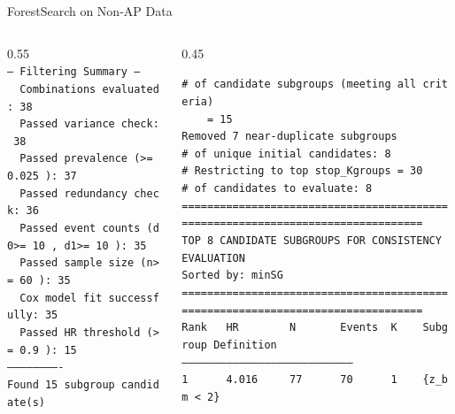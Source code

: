 \documentclass[
  ignorenonframetext,
  aspectratio=169]{beamer}
\begin{document}
\begin{frame}{ForestSearch on Non-AP Data}
\begin{columns}[T]
\begin{column}{0.55\textwidth}
{\vspace{2pt}
\texttt{---~Filtering~Summary~---}\\[-2pt]
\texttt{~~Combinations~evaluated:~38}\\[-2pt]
\texttt{~~Passed~variance~check:~38}\\[-2pt]
\texttt{~~Passed~prevalence~(>=~0.025~):~37}\\[-2pt]
\texttt{~~Passed~redundancy~check:~36}\\[-2pt]
\texttt{~~Passed~event~counts~(d0>=~10~,~d1>=~10~):~35}\\[-2pt]
\texttt{~~Passed~sample~size~(n>=~60~):~35}\\[-2pt]
\texttt{~~Cox~model~fit~successfully:~35}\\[-2pt]
\texttt{~~Passed~HR~threshold~(>=~0.9~):~15}\\[-2pt]
\texttt{-------------------------}\\[-2pt]
\vspace{2pt}
\texttt{Found~15~subgroup~candidate(s)}\\[-2pt]
}
\end{column}
\begin{column}{0.45\textwidth}
{\tiny\raggedright
\texttt{\#~of~candidate~subgroups~(meeting~all~criteria)~}\\[-2pt]
\texttt{~~~~=~15}\\[-2pt]
\texttt{Removed~7~near-duplicate~subgroups}\\[-2pt]
\texttt{\#~of~unique~initial~candidates:~8}\\[-2pt]
\texttt{\#~Restricting~to~top~stop\_Kgroups~=~30}\\[-2pt]
\texttt{\#~of~candidates~to~evaluate:~8}\\[-2pt]
\vspace{2pt}
\texttt{================================================================================}\\[-2pt]
\texttt{TOP~8~CANDIDATE~SUBGROUPS~FOR~CONSISTENCY~EVALUATION}\\[-2pt]
\texttt{Sorted~by:~minSG}\\[-2pt]
\texttt{================================================================================}\\[-2pt]
\vspace{2pt}
\texttt{Rank~~~HR~~~~~~~~N~~~~~~~Events~~K~~~~Subgroup~Definition}\\[-2pt]
\texttt{--------------------------------------------------------------------------------}\\[-2pt]
\texttt{1~~~~~~4.016~~~~~77~~~~~~70~~~~~~1~~~~\{z\_bm~<~2\}}\\[-2pt]
}
\end{column}
\end{columns}
\end{frame}
\end{document}
